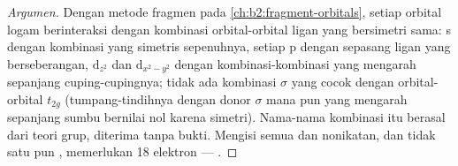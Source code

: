 \begin{proof}[Argumen]
Dengan metode fragmen pada \cref{ch:b2:fragment-orbitals}, setiap orbital
logam berinteraksi dengan kombinasi orbital-orbital ligan yang bersimetri
sama: s dengan kombinasi yang simetris sepenuhnya, setiap p dengan sepasang
ligan yang berseberangan, $\mathrm d_{z^2}$ dan $\mathrm
d_{x^2-y^2}$ dengan kombinasi-kombinasi yang mengarah sepanjang
cuping-cupingnya; tidak ada kombinasi $\sigma$ yang cocok dengan orbital-orbital
$t_{2g}$ (tumpang-tindihnya dengan donor $\sigma$ mana pun yang mengarah
sepanjang sumbu bernilai nol karena simetri). Nama-nama kombinasi itu
berasal dari teori grup, diterima tanpa bukti. Mengisi semua 
dan nonikatan, dan tidak satu pun , memerlukan 18
elektron --- .
\end{proof}

